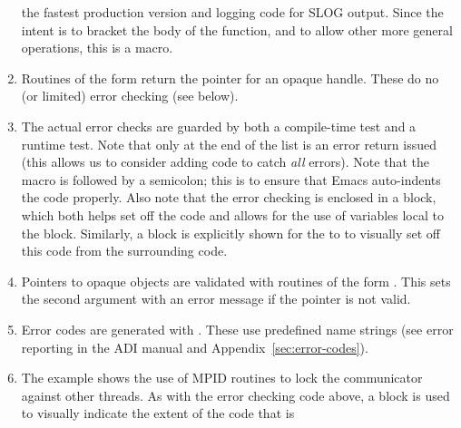 \documentclass{article}
\begin{document}
\begin{enumerate}
  the fastest production version and logging code for SLOG output.
  Since the intent is to bracket the body of the function, and to
  allow other more general operations, this is a macro.
\item Routines of the form  return the pointer
for an opaque handle.  These do no (or limited) error checking (see
 below).
\item The actual error checks are guarded by both a compile-time test and a
  runtime test.  Note that only at the end of the list is an error return
  issued (this allows us to consider adding code to catch \emph{all}
  errors).  Note that the macro  is
  followed by a semicolon; this is to ensure that Emacs auto-indents the
  code properly.
  Also note that the error checking is enclosed in a block, which
  both helps set off the code and allows for the use of variables
  local to the block.  Similarly, a block is explicitly shown for the
   to  to
  visually set off this code from the surrounding code.
%
\item Pointers to opaque objects are validated with routines of the
form .  This sets the second argument with an
error message if the pointer is not valid.
\item Error codes are generated with .  These use
  predefined name strings (see error reporting in the ADI manual and
Appendix~\ref{sec:error-codes}). 
\item The example shows the use of MPID routines to lock the communicator
  against other threads.  As with the error checking code above, a
block is used to visually indicate the extent of the code that is

\end{enumerate}
\end{document}
